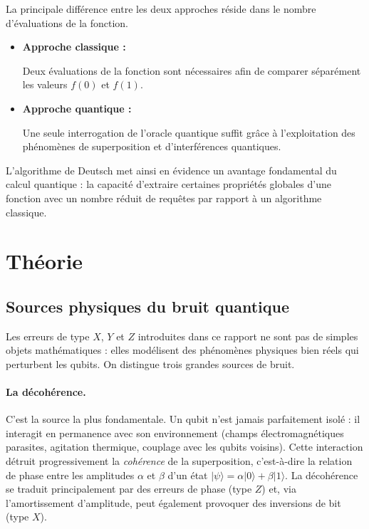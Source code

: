 \documentclass[a4paper,12pt]{article}
\begin{document}
La principale différence entre les deux approches réside dans le nombre d’évaluations de la fonction.

\begin{itemize}
    \item \textbf{Approche classique :}
    
    Deux évaluations de la fonction sont nécessaires afin de comparer séparément les valeurs $f(0)$ et $f(1)$.

    \item \textbf{Approche quantique :}
    
    Une seule interrogation de l’oracle quantique suffit grâce à l’exploitation des phénomènes de superposition et d’interférences quantiques.
\end{itemize}

L’algorithme de Deutsch met ainsi en évidence un avantage fondamental du calcul quantique : la capacité d’extraire certaines propriétés globales d’une fonction avec un nombre réduit de requêtes par rapport à un algorithme classique.

\section{Théorie}

\subsection{Sources physiques du bruit quantique}

Les erreurs de type $X$, $Y$ et $Z$ introduites dans ce rapport ne sont pas de
simples objets mathématiques : elles modélisent des phénomènes physiques bien
réels qui perturbent les qubits. On distingue trois grandes sources de bruit.

\paragraph{La décohérence.} C'est la source la plus fondamentale. Un qubit
n'est jamais parfaitement isolé : il interagit en permanence avec son
environnement (champs électromagnétiques parasites, agitation thermique,
couplage avec les qubits voisins). Cette interaction détruit progressivement la
\emph{cohérence} de la superposition, c'est-à-dire la relation de phase entre
les amplitudes $\alpha$ et $\beta$ d'un état $|\psi\rangle = \alpha|0\rangle +
\beta|1\rangle$. La décohérence se traduit principalement par des erreurs de
phase (type $Z$) et, via l'amortissement d'amplitude, peut également provoquer
des inversions de bit (type $X$).
\end{document}
